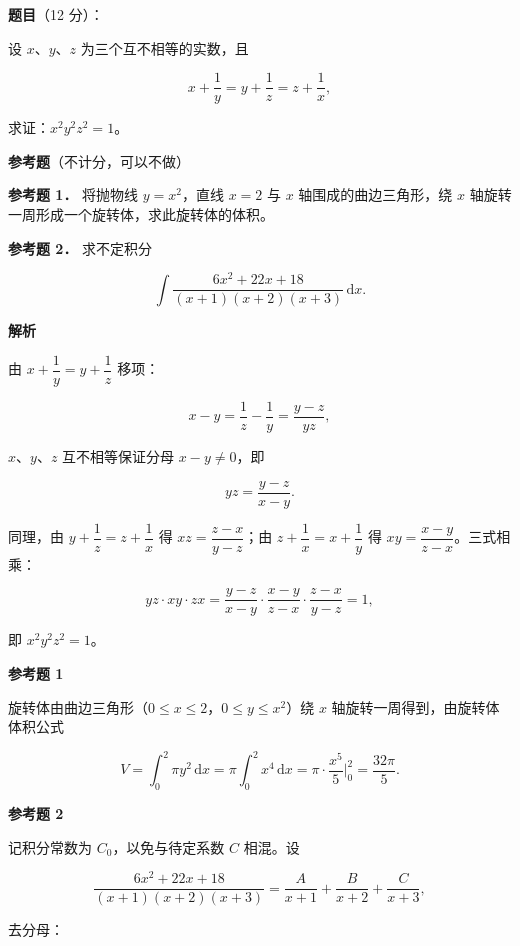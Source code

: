 \begin{answer}

\textbf{题目}（12 分）：

设 $x$、$y$、$z$ 为三个互不相等的实数，且

\nopagebreak[4]
\[
x+\frac1y=y+\frac1z=z+\frac1x,
\]

求证：$x^2y^2z^2=1$。

\begin{gktip}
\textbf{参考题}（不计分，可以不做）
\end{gktip}

\textbf{参考题 1．} 将抛物线 $y=x^2$，直线 $x=2$ 与 $x$ 轴围成的曲边三角形，绕 $x$ 轴旋转一周形成一个旋转体，求此旋转体的体积。

\textbf{参考题 2．} 求不定积分

\nopagebreak[4]
\[
\int\frac{6x^2+22x+18}{(x+1)(x+2)(x+3)}\,\mathrm dx.
\]

\textbf{解析}

由 $x+\dfrac1y=y+\dfrac1z$ 移项：

\nopagebreak[4]
\[
x-y=\frac1z-\frac1y=\frac{y-z}{yz},
\]

$x$、$y$、$z$ 互不相等保证分母 $x-y\ne0$，即

\nopagebreak[4]
\[
yz=\frac{y-z}{x-y}.
\]

同理，由 $y+\dfrac1z=z+\dfrac1x$ 得 $xz=\dfrac{z-x}{y-z}$；由 $z+\dfrac1x=x+\dfrac1y$ 得 $xy=\dfrac{x-y}{z-x}$。三式相乘：

\nopagebreak[4]
\[
yz\cdot xy\cdot zx
=\frac{y-z}{x-y}\cdot\frac{x-y}{z-x}\cdot\frac{z-x}{y-z}
=1,
\]

即 $x^2y^2z^2=1$。

\textbf{参考题 1}

旋转体由曲边三角形（$0\le x\le2$，$0\le y\le x^2$）绕 $x$ 轴旋转一周得到，由旋转体体积公式

\nopagebreak[4]
\[
V=\int_0^2\pi y^2\,\mathrm dx
=\pi\int_0^2x^4\,\mathrm dx
=\pi\cdot\frac{x^5}{5}\bigg|_0^2
=\frac{32\pi}{5}.
\]

\textbf{参考题 2}

记积分常数为 $C_0$，以免与待定系数 $C$ 相混。设

\nopagebreak[4]
\[
\frac{6x^2+22x+18}{(x+1)(x+2)(x+3)}
=\frac{A}{x+1}+\frac{B}{x+2}+\frac{C}{x+3},
\]

去分母：


\end{answer}
